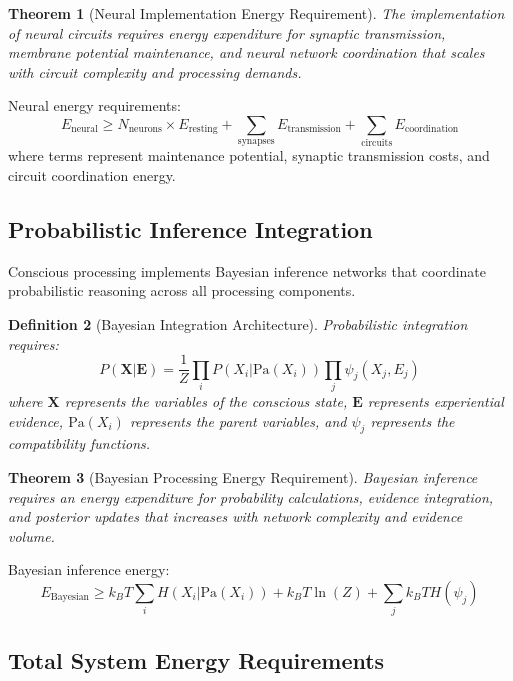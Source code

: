\documentclass[12pt,a4paper]{article}
\newtheorem{theorem}{Theorem}[section]
\newtheorem{definition}[theorem]{Definition}
\begin{document}
\begin{theorem}[Neural Implementation Energy Requirement]
 The implementation of neural circuits requires energy expenditure for synaptic transmission, membrane potential maintenance, and neural network coordination that scales with circuit complexity and processing demands.
\end{theorem}

Neural energy requirements:
\begin{equation}
E_{\text{neural}} \geq N_{\text{neurons}} \times E_{\text{resting}} + \sum_{\text{synapses}} E_{\text{transmission}} + \sum_{\text{circuits}} E_{\text{coordination}}
\end{equation}
where terms represent maintenance potential, synaptic transmission costs, and circuit coordination energy.

\subsection{Probabilistic Inference Integration}

Conscious processing implements Bayesian inference networks that coordinate probabilistic reasoning across all processing components.

\begin{definition}[Bayesian Integration Architecture]
Probabilistic integration requires:
\begin{equation}
P(\mathbf{X}|\mathbf{E}) = \frac{1}{Z} \prod_i P(X_i|\text{Pa}(X_i)) \prod_j \psi_j(X_j, E_j)
\end{equation}
where $\mathbf{X}$ represents the variables of the conscious state, $\mathbf{E}$ represents experiential evidence, $\text{Pa}(X_i)$ represents the parent variables, and $\psi_j$ represents the compatibility functions.
\end{definition}

\begin{theorem}[Bayesian Processing Energy Requirement]
Bayesian inference requires an energy expenditure for probability calculations, evidence integration, and posterior updates that increases with network complexity and evidence volume.
\end{theorem}

Bayesian inference energy:
\begin{equation}
E_{\text{Bayesian}} \geq k_B T \sum_i H(X_i|\text{Pa}(X_i)) + k_B T \ln(Z) + \sum_j k_B T H(\psi_j)
\end{equation}

\subsection{Total System Energy Requirements}
\end{document}
